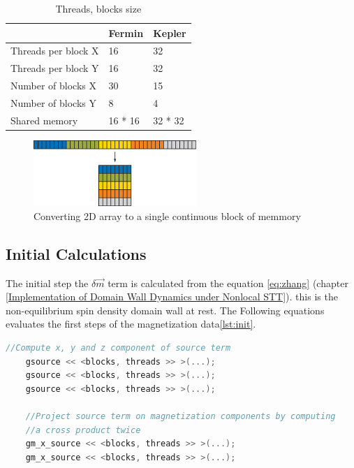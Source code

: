 \begin{table}[h]
\centering
\begin{tabular}{| l | l | l |}
\hline
 & Fermin & Kepler \\
\hline
Threads per block X  & 16 & 32 \\
\hline
Threads per block Y  & 16 & 32 \\
\hline
Number of blocks X & 30 & 15 \\
\hline
Number of blocks Y & 8 & 4 \\
\hline
Shared memory & 16 * 16 & 32 * 32 \\
\hline
\end{tabular}
\caption{Threads, blocks size}
\label{tab:threads}
\end{table}


\begin{figure}[htbp]
	\centering
		\includegraphics[width=0.55\textwidth]{Figures/flaten.png}
		\smallskip
	\caption[2D Flatten array]{Converting 2D array to a single continuous block of memmory}
	\label{fig:flaten}
\end{figure}


\subsection{Initial Calculations}

The initial step the $ \delta \vec{m}$ term is calculated from the equation \ref{eq:zhang} (chapter \ref{Implementation of Domain Wall Dynamics under Nonlocal STT}). this is the non-equilibrium spin density \cite{claudio} domain wall at rest. The Following equations evaluates the first steps of the magnetization data\ref{lst:init}.

\begin{lstlisting}[language=C++, label={lst:init}, caption={Initial calculations}]
	//Compute x, y and z component of source term
    gsource << <blocks, threads >> >(...);
    gsource << <blocks, threads >> >(...);
    gsource << <blocks, threads >> >(...);

    //Project source term on magnetization components by computing
    //a cross product twice
    gm_x_source << <blocks, threads >> >(...);
    gm_x_source << <blocks, threads >> >(...);
\end{lstlisting}

